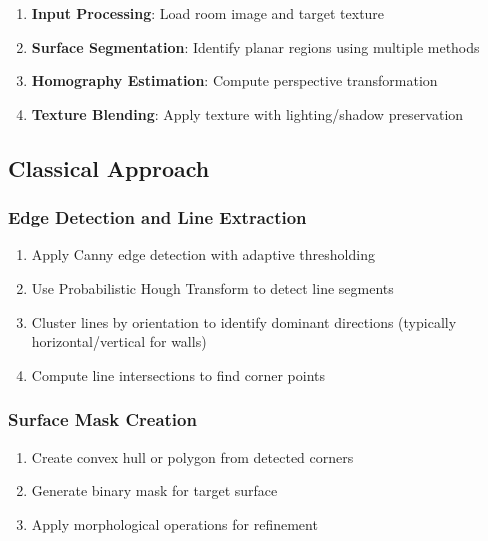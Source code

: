\documentclass[11pt]{article}
\begin{document}
\begin{enumerate}
    \item \textbf{Input Processing}: Load room image and target texture
    \item \textbf{Surface Segmentation}: Identify planar regions using multiple methods
    \item \textbf{Homography Estimation}: Compute perspective transformation
    \item \textbf{Texture Blending}: Apply texture with lighting/shadow preservation
\end{enumerate}


\subsection{Classical Approach}

\subsubsection{Edge Detection and Line Extraction}
\begin{enumerate}
    \item Apply Canny edge detection with adaptive thresholding
    \item Use Probabilistic Hough Transform to detect line segments
    \item Cluster lines by orientation to identify dominant directions (typically horizontal/vertical for walls)
    \item Compute line intersections to find corner points
\end{enumerate}

\subsubsection{Surface Mask Creation}
\begin{enumerate}
    \item Create convex hull or polygon from detected corners
    \item Generate binary mask for target surface
    \item Apply morphological operations for refinement
\end{enumerate}
\end{document}
